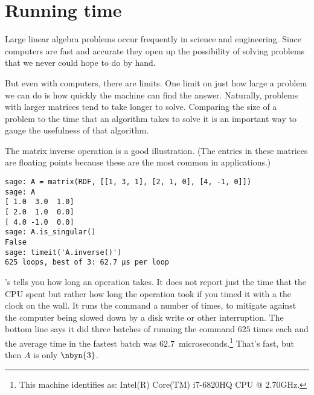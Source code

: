 \section{Running time}
Large linear algebra problems occur frequently in science and
engineering.
Since computers are fast and accurate
they open up the possibility of solving problems
that we never could hope to do by hand.

But even with computers, there are limits.
One limit on just how large a problem we can do is 
how quickly the machine can find the answer.
Naturally, problems with larger matrices tend to take longer to solve.
Comparing the size of a problem to the time that an algorithm takes to 
solve it is an important way to gauge the usefulness of 
that algorithm.

The matrix inverse operation is a good illustration.
(The entries in these matrices are floating points 
because these are the most common in applications.)
\begin{lstlisting}
sage: A = matrix(RDF, [[1, 3, 1], [2, 1, 0], [4, -1, 0]])
sage: A
[ 1.0  3.0  1.0]
[ 2.0  1.0  0.0]
[ 4.0 -1.0  0.0]
sage: A.is_singular()
False
sage: timeit('A.inverse()')
625 loops, best of 3: 62.7 μs per loop
\end{lstlisting}
\Sage's  tells you how long
an operation takes.
It does not report just the time that the CPU
spent but rather how long the operation took if you timed
it with a the clock on the wall.
It runs the command 
a number of times, to mitigate against the
computer being slowed down by a 
disk write or other interruption.
The bottom line says it did three batches of running the command 
$625$ times each and the average time in the fastest batch
was $62.7$~microseconds.\footnote{%
  This machine 
  identifies as: Intel(R) Core(TM) i7-6820HQ CPU @ 2.70GHz.}
That's fast, but then $A$ is only $\nbyn{3}$.

